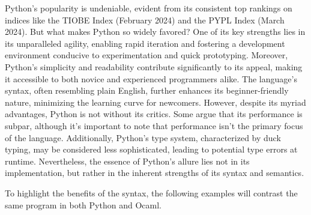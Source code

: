 \documentclass{l4proj}
\begin{document}
Python's popularity is undeniable, evident from its consistent top rankings on indices like the TIOBE Index (February 2024) and the PYPL Index (March 2024).
But what makes Python so widely favored? One of its key strengths lies in its unparalleled agility, enabling rapid iteration and fostering a development environment conducive to experimentation and quick prototyping.
Moreover, Python's simplicity and readability contribute significantly to its appeal, making it accessible to both novice and experienced programmers alike.
The language's syntax, often resembling plain English, further enhances its beginner-friendly nature, minimizing the learning curve for newcomers.
However, despite its myriad advantages, Python is not without its critics.
Some argue that its performance is subpar, although it's important to note that performance isn't the primary focus of the language.
Additionally, Python's type system, characterized by duck typing, may be considered less sophisticated, leading to potential type errors at runtime.
Nevertheless, the essence of Python's allure lies not in its implementation, but rather in the inherent strengths of its syntax and semantics.

To highlight the benefits of the syntax, the following examples will contrast the same program in both Python and Ocaml.






\end{document}
